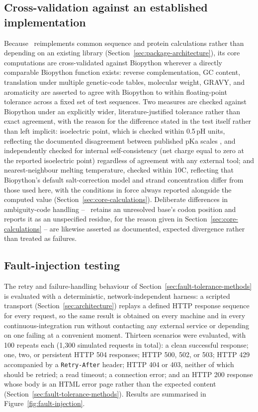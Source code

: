 \subsection{Cross-validation against an established implementation}
\label{sec:cross-validation}

Because \bsi\ reimplements common sequence and protein calculations rather
than depending on an existing library (Section~\ref{sec:package-architecture}),
its core computations are cross-validated against Biopython
\citep{cock2009biopython} wherever a directly comparable Biopython function
exists: reverse complementation, GC content, translation under multiple
genetic-code tables, molecular weight, GRAVY, and aromaticity are asserted
to agree with Biopython to within floating-point tolerance across a fixed
set of test sequences. Two measures are checked against Biopython under an
explicitly wider, literature-justified tolerance rather than exact
agreement, with the reason for the difference stated in the test itself
rather than left implicit: isoelectric point, which is checked within
0.5\,pH units, reflecting the documented disagreement between published pKa
scales \citep{kozlowski2016ipc}, and independently checked for internal
self-consistency (net charge equal to zero at the reported isoelectric
point) regardless of agreement with any external tool; and nearest-neighbour
melting temperature, checked within 10\textdegree{}C, reflecting that
Biopython's default salt-correction model and strand concentration differ
from those used here, with the conditions in force always reported
alongside the computed value (Section~\ref{sec:core-calculations}).
Deliberate differences in ambiguity-code handling -- \bsi\ retains an
unresolved base's codon position and reports it as an unspecified residue,
for the reason given in Section~\ref{sec:core-calculations} -- are likewise
asserted as documented, expected divergence rather than treated as failures.

\subsection{Fault-injection testing}
\label{sec:fault-injection}

The retry and failure-handling behaviour of Section~\ref{sec:fault-tolerance-methods}
is evaluated with a deterministic, network-independent harness: a scripted
transport (Section~\ref{sec:architecture}) replays a defined HTTP response
sequence for every request, so the same result is obtained on every machine
and in every continuous-integration run without contacting any external
service or depending on one failing at a convenient moment. Thirteen
scenarios were evaluated, with 100 repeats each (1{,}300 simulated requests
in total): a clean successful response; one, two, or persistent HTTP 504
responses; HTTP 500, 502, or 503; HTTP 429 accompanied by a
\texttt{Retry-After} header; HTTP 404 or 403, neither of which should be
retried; a read timeout; a connection error; and an HTTP 200 response whose
body is an HTML error page rather than the expected content
(Section~\ref{sec:fault-tolerance-methods}).
Results are summarised in Figure~\ref{fig:fault-injection}.

